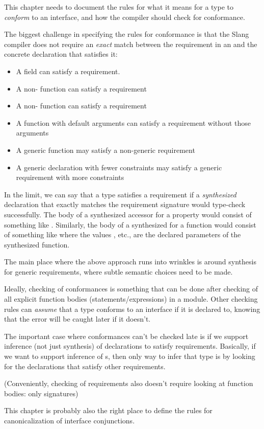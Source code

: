 
\begin{TODO}
This chapter needs to document the rules for what it means for a type to \emph{conform} to an interface, and how the compiler should check for conformance.


The biggest challenge in specifying the rules for conformance is that the Slang compiler does not require an \emph{exact} match between the requirement in an  and the concrete declaration that satisfies it:

\begin{itemize}
\item A field can satisfy a  requirement.
\item A non- function can satisfy a  requirement
\item A non-\kw{[mutating]} function can satisfy a \kw{[mutating]} requirement
\item A function with default arguments can satisfy a requirement without those arguments
\item A generic function may satisfy a non-generic requirement
\item A generic declaration with fewer constraints may satisfy a generic requirement with more constraints
\end{itemize}

In the limit, we can say that a type satisfies a requirement if a \emph{synthesized} declaration that exactly matches the requirement signature would type-check successfully.
The body of a synthesized  accessor for a property  would consist of something like .
Similarly, the body of a synthesized  for a function  would consist of something like  where the values , etc., are the declared parameters of the synthesized function.

The main place where the above approach runs into wrinkles is around synthesis for generic requirements, where subtle semantic choices need to be made.

Ideally, checking of conformances is something that can be done after checking of all explicit function bodies (statements/expressions) in a module.
Other checking rules can \emph{assume} that a type conforms to an interface if it is declared to, knowing that the error will be caught later if it doesn't.

The important case where conformances can't be checked late is if we support inference (not just synthesis) of declarations to satisfy requirements.
Basically, if we want to support inference of s, then only way to infer that type is by looking for the declarations that satisfy other requirements.

(Conveniently, checking of requirements also doesn't require looking at function bodies: only signatures)

This chapter is probably also the right place to define the rules for canonicalization of interface conjunctions.

\end{TODO}